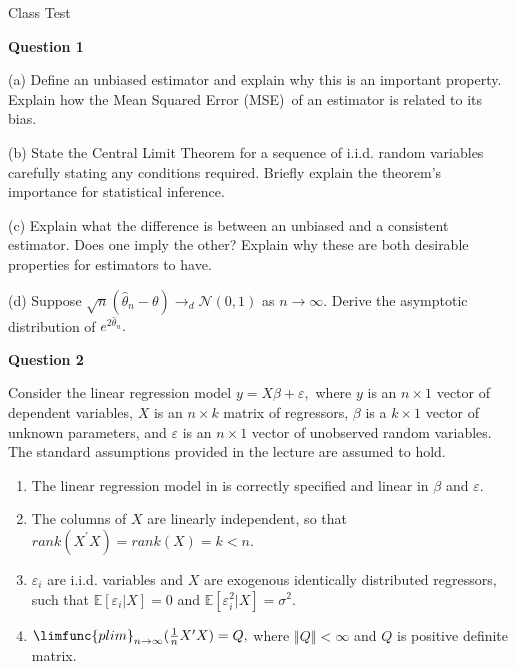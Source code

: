 \documentclass{article}
\begin{document}
\begin{center}
{\Large Class Test}
\end{center}

\textbf{Question 1}

(a) Define an unbiased estimator and explain why this is an important
property. Explain how the Mean Squared Error (MSE)\ of an estimator is
related to its bias.

(b) State the Central Limit Theorem for a sequence of i.i.d. random
variables carefully stating any conditions required. Briefly explain the
theorem's importance for statistical inference.

(c) Explain what the difference is between an unbiased and a consistent
estimator. Does one imply the other? Explain why these are both desirable
properties for estimators to have.

(d) Suppose $\sqrt{n}\left( \hat{\theta}_{n}-\theta \right) \rightarrow _{d}%
\mathcal{N}\left( 0,1\right) $ as $n\rightarrow \infty .$ Derive the
asymptotic distribution of $e^{2\widehat{\theta }_{n}}.$\bigskip 

\textbf{Question 2}

Consider the linear regression model $y=X\beta +\varepsilon ,$ where $y$ is
an $n\times 1$ vector of dependent variables, $X$ is an $n\times k$ matrix
of regressors, $\beta $ is a $k\times 1$ vector of unknown parameters, and $%
\varepsilon $ is an $n\times 1$ vector of unobserved random variables. The
standard assumptions provided in the lecture are assumed to hold.

\begin{enumerate}
\item The linear regression model in is correctly specified and linear in $%
\beta $ and $\varepsilon .$

\item The columns of $X$ are linearly independent, so that $rank(X^{\prime
}X)=rank(X)=k<n.$

\item $\varepsilon _{i}$ are i.i.d. variables and $X$ are exogenous
identically distributed regressors, such that $\mathbb{E}[\varepsilon
_{i}|X]=0$ and $\mathbb{E}[\varepsilon _{i}^{2}|X]=\sigma ^{2}.$

\item $\limfunc{plim}_{n\rightarrow \infty }(\frac{1}{n}X^{\prime }X)=Q,$
where $\left\Vert Q\right\Vert <\infty $ and $Q$ is positive definite matrix.
\end{enumerate}
\end{document}
